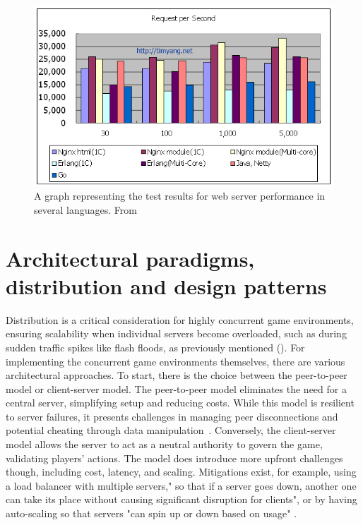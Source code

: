 \documentclass[]{final}
\begin{document}
\begin{figure}[ht!]
  \centering
  \includegraphics[width=.8\linewidth]{c_erlang_java_go}
  \caption{A graph representing the test results for web server performance in several languages. From \cite{yang_c_nodate}}
  \label{fig: 1}
\end{figure}


\chapter{Architectural paradigms, distribution and design patterns}

Distribution is a critical consideration for highly concurrent game
environments, ensuring scalability when individual servers become
overloaded, such as during sudden traffic spikes like flash floods, as
previously mentioned {\hypersetup{linkcolor=teal}(\pageref{rationale_problem})}.
For implementing the concurrent game environments themselves, there are various architectural approaches.
To start, there is the choice between the peer-to-peer model or client-server model.
The peer-to-peer model eliminates the need for a central server, simplifying setup and
reducing costs. While this model is resilient to server failures, it presents challenges
in managing peer disconnections and potential cheating through data manipulation~\cite{franchetti_coping_2020}.
Conversely, the client-server model allows the server to act as a neutral authority to govern the game,
validating players' actions. The model does introduce more upfront challenges though, including cost,
latency, and scaling. Mitigations exist, for example, using a load balancer with multiple servers," so
that if a server goes down, another one can take its place without causing significant
disruption for clients", or by having auto-scaling so that servers "can spin up or down
based on usage" \cite{pandey_peer--peer_2022}.
\end{document}
